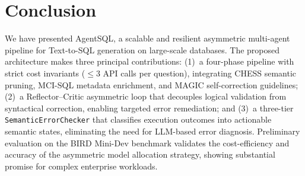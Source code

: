 \section{Conclusion}
\label{sec:conclusion}

We have presented AgentSQL, a scalable and resilient asymmetric multi-agent pipeline for Text-to-SQL generation on large-scale databases. The proposed architecture makes three principal contributions: (1)~a four-phase pipeline with strict cost invariants ($\leq 3$ API calls per question), integrating CHESS semantic pruning, MCI-SQL metadata enrichment, and MAGIC self-correction guidelines; (2)~a Reflector--Critic asymmetric loop that decouples logical validation from syntactical correction, enabling targeted error remediation; and (3)~a three-tier \texttt{SemanticErrorChecker} that classifies execution outcomes into actionable semantic states, eliminating the need for LLM-based error diagnosis. Preliminary evaluation on the BIRD Mini-Dev benchmark validates the cost-efficiency and accuracy of the asymmetric model allocation strategy, showing substantial promise for complex enterprise workloads.
